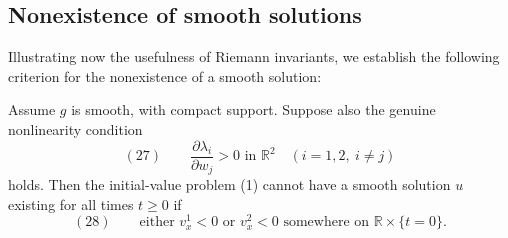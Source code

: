 \subsection{Nonexistence of smooth solutions}\label{sec:nonexistence-smooth-solutions-systems}

Illustrating now the usefulness of Riemann invariants, we establish the following criterion for the nonexistence of a smooth solution:

\begin{theorem}
\label{thm:riemann-invariants-blowup}
Assume $g$ is smooth, with compact support. Suppose also the genuine nonlinearity condition
$$(27) \qquad \frac{\partial\lambda_i}{\partial w_j} > 0 \text{ in } \mathbb{R}^2 \quad (i=1,2,\ i\neq j)$$
holds. Then the initial-value problem (1) cannot have a smooth solution $u$ existing for all times $t\geq 0$ if
$$(28) \qquad \text{either } v^1_x < 0 \text{ or } v^2_x < 0 \text{ somewhere on } \mathbb{R}\times\{t=0\}.$$
\end{theorem}

